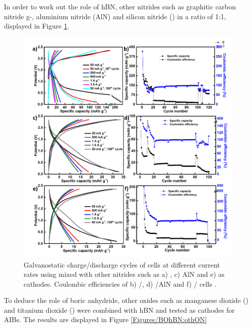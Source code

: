 In order to work out the role of hBN, other nitrides such as graphitic carbon nitride g-, aluminium nitride (AlN) and silicon nitride () in a ratio of 1:1, displayed in Figure \ref{Figures/BOhBN:Bonit}. 
\begin{figure}[tbh!]
\centering
\includegraphics[width=\textwidth]{Figures/BOhBN/Bonit}
\caption{Galvanostatic charge/discharge cycles of cells at different current rates using  mixed with other nitrides such as a) , c) AlN and e)  as cathodes. Coulombic efficiencies of b) /, d) /AlN and f) / cells .}
\label{Figures/BOhBN:Bonit}
\end{figure}

To deduce the role of boric anhydride, other oxides such as manganese dioxide () and titanium dioxide () were combined with hBN and tested as cathodes for AIBs. The results are displayed in Figure \ref{Figures/BOhBN:othON}

